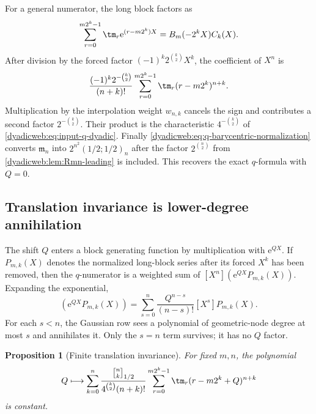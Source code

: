 \documentclass[11pt,oneside]{article}
\newtheorem{proposition}[theorem]{Proposition}
\theoremstyle{definition}
\theoremstyle{remark}
\newcommand{\e}{\mathrm e}
\newcommand{\qbinom}[3]{\genfrac{[}{]}{0pt}{}{#1}{#2}_{#3}}
\begin{document}
For a general numerator, the long block factors as
\begin{equation}
 \sum_{r=0}^{m2^k-1}\tm_r\e^{(r-m2^k)X}
 =B_m(-2^kX)C_k(X).                                       \label{dyadicweb:eq:long-block-local}
\end{equation}
After division by the forced factor
$(-1)^k2^{\binom k2}X^k$, the coefficient of $X^n$ is
\begin{equation}
 \frac{(-1)^k2^{-\binom k2}}{(n+k)!}
 \sum_{r=0}^{m2^k-1}\tm_r(r-m2^k)^{n+k}.                 \label{dyadicweb:eq:node-value-power-sum}
\end{equation}
Multiplication by the interpolation weight $w_{n,k}$ cancels the sign and contributes a
second factor $2^{-\binom k2}$.  Their product is the characteristic
$4^{-\binom k2}$ of \eqref{dyadicweb:eq:input-q-dyadic}.  Finally
\eqref{dyadicweb:eq:q-barycentric-normalization} converts $\mathfrak m_n$ into
$2^{n^2}(1/2;1/2)_n$ after the factor $2^{\binom n2}$ from
\cref{dyadicweb:lem:Rmn-leading} is included.  This recovers the exact $q$-formula with $Q=0$.

\subsection{Translation invariance is lower-degree annihilation}

The shift $Q$ enters a block generating function by multiplication with $\e^{QX}$.  If
\(
 P_{m,k}(X)
\)
denotes the normalized long-block series after its forced $X^k$ has been removed, then the
$q$-numerator is a weighted sum of $[X^n](\e^{QX}P_{m,k}(X))$.  Expanding the exponential,
\begin{equation}
 [X^n](\e^{QX}P_{m,k}(X))
 =\sum_{s=0}^{n}\frac{Q^{n-s}}{(n-s)!}[X^s]P_{m,k}(X).     \label{dyadicweb:eq:Q-expansion}
\end{equation}
For each $s<n$, the Gaussian row sees a polynomial of geometric-node degree at most $s$ and
annihilates it.  Only the $s=n$ term survives; it has no $Q$ factor.

\begin{proposition}[Finite translation invariance]
\label{dyadicweb:prop:finite-Q-invariance}
For fixed $m,n$, the polynomial
\begin{equation}
 Q\longmapsto
 \sum_{k=0}^{n}
 \frac{\qbinom nk{1/2}}{4^{\binom k2}(n+k)!}
 \sum_{r=0}^{m2^k-1}\tm_r(r-m2^k+Q)^{n+k}                 \label{dyadicweb:eq:Q-polynomial}
\end{equation}
is constant.
\end{proposition}
\end{document}
